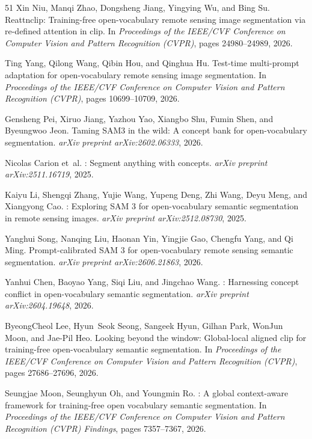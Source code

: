 \begin{thebibliography}{51}
Xin Niu, Manqi Zhao, Dongsheng Jiang, Yingying Wu, and Bing Su.
\newblock Reattnclip: Training-free open-vocabulary remote sensing image
  segmentation via re-defined attention in clip.
\newblock In \emph{Proceedings of the IEEE/CVF Conference on Computer Vision
  and Pattern Recognition (CVPR)}, pages 24980--24989, 2026.

Ting Yang, Qilong Wang, Qibin Hou, and Qinghua Hu.
\newblock Test-time multi-prompt adaptation for open-vocabulary remote sensing
  image segmentation.
\newblock In \emph{Proceedings of the IEEE/CVF Conference on Computer Vision
  and Pattern Recognition (CVPR)}, pages 10699--10709, 2026.

Gensheng Pei, Xiruo Jiang, Yazhou Yao, Xiangbo Shu, Fumin Shen, and Byeungwoo
  Jeon.
\newblock Taming {SAM3} in the wild: A concept bank for open-vocabulary
  segmentation.
\newblock \emph{arXiv preprint arXiv:2602.06333}, 2026{}.

Nicolas Carion et~al.
: Segment anything with concepts.
\newblock \emph{arXiv preprint arXiv:2511.16719}, 2025.

Kaiyu Li, Shengqi Zhang, Yujie Wang, Yupeng Deng, Zhi Wang, Deyu Meng, and
  Xiangyong Cao.
: Exploring {SAM 3} for open-vocabulary semantic
  segmentation in remote sensing images.
\newblock \emph{arXiv preprint arXiv:2512.08730}, 2025{}.

Yanghui Song, Nanqing Liu, Haonan Yin, Yingjie Gao, Chengfu Yang, and Qi Ming.
\newblock Prompt-calibrated {SAM 3} for open-vocabulary remote sensing semantic
  segmentation.
\newblock \emph{arXiv preprint arXiv:2606.21863}, 2026.

Yanhui Chen, Baoyao Yang, Siqi Liu, and Jingchao Wang.
: Harnessing concept conflict in open-vocabulary semantic
  segmentation.
\newblock \emph{arXiv preprint arXiv:2604.19648}, 2026{}.

ByeongCheol Lee, Hyun~Seok Seong, Sangeek Hyun, Gilhan Park, WonJun Moon, and
  Jae-Pil Heo.
\newblock Looking beyond the window: Global-local aligned clip for
  training-free open-vocabulary semantic segmentation.
\newblock In \emph{Proceedings of the IEEE/CVF Conference on Computer Vision
  and Pattern Recognition (CVPR)}, pages 27686--27696, 2026.

Seungjae Moon, Seunghyun Oh, and Youngmin Ro.
: A global context-aware framework for training-free
  open vocabulary semantic segmentation.
\newblock In \emph{Proceedings of the IEEE/CVF Conference on Computer Vision
  and Pattern Recognition (CVPR) Findings}, pages 7357--7367, 2026.


\end{thebibliography}
